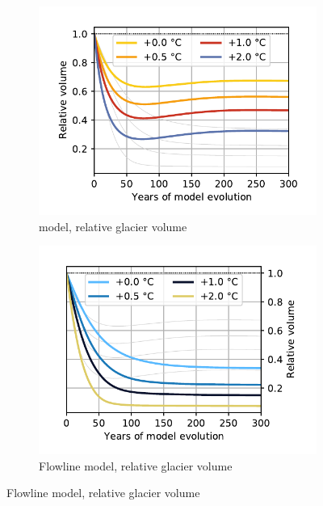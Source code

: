     \begin{figure}[htp]
      \centering
      \begin{subfigure}[b]{0.48\textwidth}
        \caption{\Vas{} model, relative glacier volume}
        \label{fig:histalp_projection:volume_norm_const}
        \centering
        \includegraphics[width=\textwidth]{../plots/final_plots/time_series/histalp_projection/volume_norm_vas.pdf}
      \end{subfigure}
      \hfill
      \begin{subfigure}[b]{0.48\textwidth}
        \caption{Flowline model, relative glacier volume}
        \label{fig:histalp_projection:volume_norm_random}
        \centering
        \includegraphics[width=\textwidth]{../plots/final_plots/time_series/histalp_projection/volume_norm_fl.pdf}

\end{subfigure}
\end{figure}
